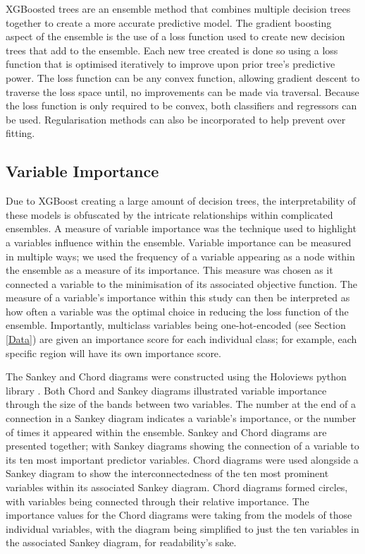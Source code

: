 \documentclass[review,12pt,authoryear]{elsarticle}
\begin{document}
\begin{linenumbers}
\par
XGBoosted trees are an ensemble method that combines multiple decision trees together to create a more accurate predictive model. The gradient boosting aspect of the ensemble is the use of a loss function used to create new decision trees that add to the ensemble. Each new tree created is done so using a loss function that is optimised iteratively to improve upon prior tree's predictive power. The loss function can be any convex function, allowing gradient descent to traverse the loss space until, no improvements can be made via traversal. Because the loss function is only required to be convex, both classifiers and regressors can be used. Regularisation methods can also be incorporated to help prevent over fitting.
\subsection{Variable Importance}\label{sec:importance}
Due to XGBoost creating a large amount of decision trees, the interpretability of these models is obfuscated by the intricate relationships within complicated ensembles. A measure of variable importance was the technique used to highlight a variables influence within the ensemble. Variable importance can be measured in multiple ways; we used the frequency of a variable appearing as a node within the ensemble as a measure of its importance. This measure was chosen as it connected a variable to the minimisation of its associated objective function. The measure of a variable's importance within this study can then be interpreted as how often a variable was the optimal choice in reducing the loss function of the ensemble. Importantly, multiclass variables being one-hot-encoded (see Section \ref{Data}) are given an importance score for each individual class; for example, each specific region will have its own importance score.
\par
The Sankey and Chord diagrams were constructed using the Holoviews python library \citep{philipp_rudiger_2020_3904606}. Both Chord and Sankey diagrams illustrated variable importance through the size of the bands between two variables. The number at the end of a connection in a Sankey diagram indicates a variable's importance, or the number of times it appeared within the ensemble. Sankey and Chord  diagrams are presented together; with Sankey diagrams showing the connection of a variable to its ten most important predictor variables. Chord diagrams were used alongside a Sankey diagram to show the interconnectedness of the ten most prominent variables within its associated Sankey diagram. Chord diagrams formed circles, with variables being connected through their relative importance. The importance values for the Chord diagrams were taking from the models of those individual variables, with the diagram being simplified to just the ten variables in the associated Sankey diagram, for readability's sake.


\end{linenumbers}
\end{document}
